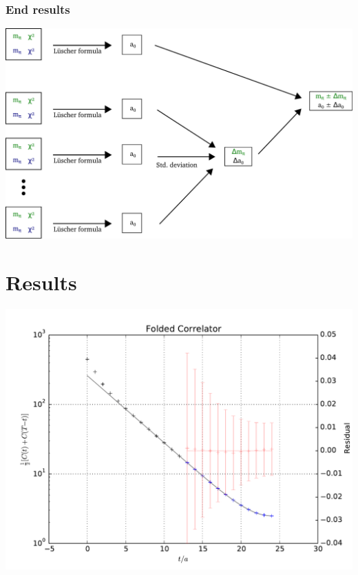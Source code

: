 \documentclass[english, fleqn]{beamer}
\begin{document}
\begin{frame}
    \frametitle{End results}
    \begin{center}
        \includegraphics[scale=\scale]{sketches/08-end-result.pdf}
    \end{center}
\end{frame}


\section{Results}

\begin{frame}
    \begin{centering}
        \includegraphics[height=\textheight]{plots/A100_24_L24_T48_beta190_mul0100_musig150_mudel190_kappa1632550__ev120__TB2_SO_LI6_new_c2_folded.pdf}
    \end{centering}
\end{frame}
\end{document}
